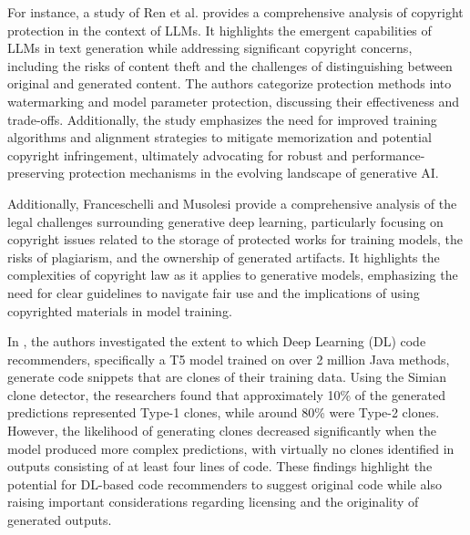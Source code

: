 

For instance, a study of Ren et al. \cite{} provides a comprehensive analysis of copyright protection in the context of LLMs. It highlights the emergent capabilities of LLMs in text generation while addressing significant copyright concerns, including the risks of content theft and the challenges of distinguishing between original and generated content. The authors categorize protection methods into watermarking and model parameter protection, discussing their effectiveness and trade-offs. Additionally, the study emphasizes the need for improved training algorithms and alignment strategies to mitigate memorization and potential copyright infringement, ultimately advocating for robust and performance-preserving protection mechanisms in the evolving landscape of generative AI.

Additionally, Franceschelli and Musolesi \cite{} provide a comprehensive analysis of the legal challenges surrounding generative deep learning, particularly focusing on copyright issues related to the storage of protected works for training models, the risks of plagiarism, and the ownership of generated artifacts. It highlights the complexities of copyright law as it applies to generative models, emphasizing the need for clear guidelines to navigate fair use and the implications of using copyrighted materials in model training. 



In \cite{Ciniselli:CloningCode:ICPC:2022}, the authors investigated the extent to which Deep Learning (DL) code recommenders, specifically a T5 model trained on over 2 million Java methods, generate code snippets that are clones of their training data. Using the Simian clone detector, the researchers found that approximately 10\% of the generated predictions represented Type-1 clones, while around 80\% were Type-2 clones. However, the likelihood of generating clones decreased significantly when the model produced more complex predictions, with virtually no clones identified in outputs consisting of at least four lines of code. These findings highlight the potential for DL-based code recommenders to suggest original code while also raising important considerations regarding licensing and the originality of generated outputs.

